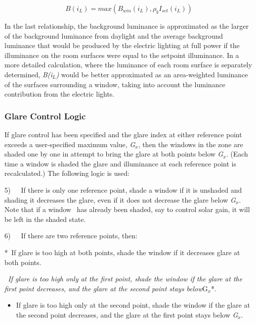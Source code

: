 \begin{equation}
B\left( {{i_L}} \right) = max\left( {{B_{win}}\left( {{i_L}} \right),{\rho_b}{I_{set}}\left( {{i_L}} \right)} \right)
\end{equation}

In the last relationship, the background luminance is approximated as the larger of the background luminance from daylight and the average background luminance that would be produced by the electric lighting at full power if the illuminance on the room surfaces were equal to the setpoint illuminance. In a more detailed calculation, where the luminance of each room surface is separately determined, \emph{B(i\(_{L}\))} would be better approximated as an area-weighted luminance of the surfaces surrounding a window, taking into account the luminance contribution from the electric lights.

\subsubsection{Glare Control Logic}\label{glare-control-logic}

If glare control has been specified and the glare index at either reference point exceeds a user-specified maximum value, \emph{G\(_{x}\)}, then the windows in the zone are shaded one by one in attempt to bring the glare at both points below \emph{G\(_{x}\)}. (Each time a window is shaded the glare and illuminance at each reference point is recalculated.) The following logic is used:

5)~~~If there is only one reference point, shade a window if it is unshaded and shading it decreases the glare, even if it does not decrease the glare below \emph{G\(_{x}\)}. Note that if a window~ has already been shaded, say to control solar gain, it will be left in the shaded state.

6)~~~If there are two reference points, then:

*~If glare is too high at both points, shade the window if it decreases glare at both points.

\emph{~If glare is too high only at the first point, shade the window if the glare at the first point decreases, and the glare at the second point stays below}G\(_{x}\)*.

\begin{itemize}
\tightlist
\item
  If glare is too high only at the second point, shade the window if the glare at the second point decreases, and the glare at the first point stays below \emph{G\(_{x}\)}.
\end{itemize}

